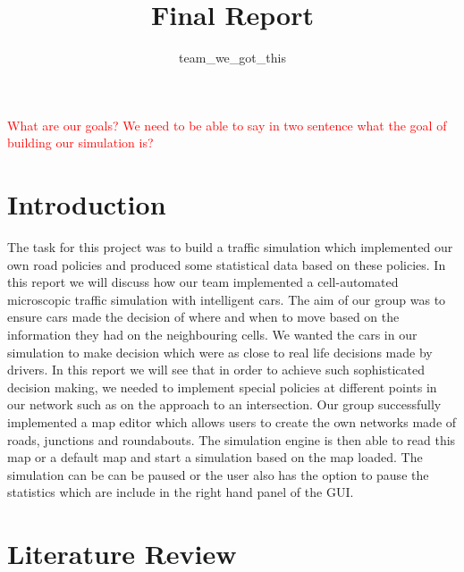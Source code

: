 \documentclass{article}
\begin{document}
	
	
	\title{Final Report}
	\author{team\_we\_got\_this}
	\maketitle
	\thispagestyle{plain}
	\graphicspath{ {Images/} }
	
	\tableofcontents
	\listoffigures
	\listoftables
	\vspace{2cm}
	\textcolor{red}{What are our goals? We need to be able to say in two sentence what the goal of building our simulation is? }
	
	\pagebreak
	\section{Introduction}
	The task for this project was to build a traffic simulation which implemented our own road policies and produced some statistical data based on these policies. In this report we will discuss how our team implemented a cell-automated microscopic traffic simulation with intelligent cars. The aim of our group was to ensure cars made the decision of where and when to move based on the information they had on the neighbouring cells.  We wanted the cars in our simulation to make decision which were as close to real life decisions made by drivers. In this report we will see that in order to achieve such sophisticated decision making, we needed to implement special policies at different points in our network such as on the approach to an intersection. Our group successfully implemented a map editor which allows users to create the own networks made of roads, junctions and roundabouts. The simulation engine is then able to read this map or a default map and start a simulation based on the map loaded. The simulation can be can be paused or the user also has the option to pause the statistics which are include in the right hand panel of the GUI. 
	\section{Literature Review}
	
\end{document}
